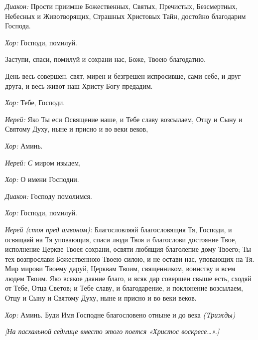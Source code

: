 \begin{mymulticols}
{\itshape Диакон:} Прости приимше Божественных, Святых, Пречистых, Безсмертных, Небесных и Животворящих, Страшных Христовых Тайн, достойно благодарим Господа. 

{\itshape Хор:} Господи, помилуй. 

Заступи, спаси, помилуй и сохрани нас, Боже, Твоею благодатию. 

День весь совершен, свят, мирен и безгрешен испросивше, сами себе, и друг друга, и весь живот наш Христу Богу предадим. 

{\itshape Хор:} Тебе, Господи. 

{\itshape Иерей:} Яко Ты еси Освящение наше, и Тебе славу возсылаем, Отцу и Сыну и Святому Духу, ныне и присно и во веки веков,

{\itshape Хор:} Аминь.

{\itshape Иерей: С} миром изыдем, 

{\itshape Хор:} О имени Господни. 

{\itshape Диакон:} Господу помолимся.

{\itshape Хор:} Господи, помилуй. 


{\itshape  Иерей (стоя пред амвоном):} Благословляяй благословящия Тя, Господи, и освящаяй на Тя уповающия, спаси люди Твоя и благослови достояние Твое, исполнение Церкве Твоея сохрани, освяти любящия благолепие дому Твоего; Ты тех возпрослави Божественною Твоею силою, и не остави нас, уповающих на Тя. Мир мирови Твоему даруй, Церквам Твоим, священником, воинству и всем людем Твоим. Яко всякое даяние благо, и всяк дар совершен свыше есть, сходяй от Тебе, Отца Светов; и Тебе славу, и благодарение, и поклонение возсылаем, Отцу и Сыну и Святому Духу, ныне и присно и во веки веков. 

{\itshape Хор:} Аминь. Буди Имя Господне благословено отныне и до века {\itshape (Tрижды)}

{\itshape [На пасхальной седмице вместо этого поется «Христос воскресе…».]}



\end{mymulticols}
